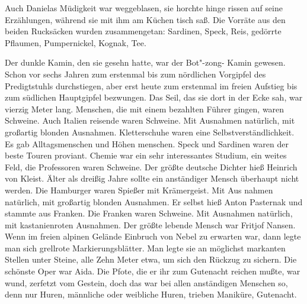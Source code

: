 Auch Danielas Müdigkeit war weggeblasen, sie horchte hinge\-%
rissen auf seine Erzählungen, während sie mit ihm am Küchen\-%
tisch saß. Die Vorräte aus den beiden Rucksäcken wurden
zusammengetan: Sardinen, Speck, Reis, gedörrte Pflaumen,
Pumpernickel, Kognak, Tee.

Der dunkle Kamin, den sie gesehn hatte, war der Bot"-zong-%
Kamin gewesen. Schon vor sechs Jahren zum erstenmal bis
zum nördlichen Vorgipfel des Predigtstuhls durchstiegen,
aber erst heute zum erstenmal im freien Aufstieg bis zum
südlichen Hauptgipfel bezwungen. Das Seil, das sie dort in
der Ecke sah, war vierzig Meter lang. Menschen, die mit einem
bezahlten Führer gingen, waren Schweine. Auch Italien\-%
reisende waren Schweine. Mit Ausnahmen natürlich, mit
großartig blonden Ausnahmen. Kletterschuhe waren eine
Selbstverständlichkeit. Es gab Alltagsmenschen und Höhen\-%
menschen. Speck und Sardinen waren der beste Touren\-%
proviant. Chemie war ein sehr interessantes Studium, ein
weites Feld, die Professoren waren Schweine. Der größte
deutsche Dichter hieß Heinrich von Kleist. Älter als dreißig
Jahre sollte ein anständiger Mensch überhaupt nicht werden.
Die Hamburger waren Spießer mit Krämergeist. Mit Aus\-%
nahmen natürlich, mit großartig blonden Ausnahmen. Er
selbst hieß Anton Pasternak und stammte aus Franken. Die
Franken waren Schweine. Mit Ausnahmen natürlich, mit
kastanienroten Ausnahmen. Der größte lebende Mensch war
Fritjof Nansen. Wenn im freien alpinen Gelände Einbruch
von Nebel zu erwarten war, dann legte man sich grellrote
Markierungsblätter. Man legte sie an möglichst markanten
Stellen unter Steine, alle Zehn Meter etwa, um sich den
Rückzug zu sichern. Die schönste Oper war Aida. Die Pfote,
die er ihr zum Gutenacht reichen mußte, war wund, zerfetzt
vom Gestein, doch das war bei allen anständigen Menschen
so, denn nur Huren, männliche oder weibliche Huren, trieben
Maniküre, Gutenacht.

